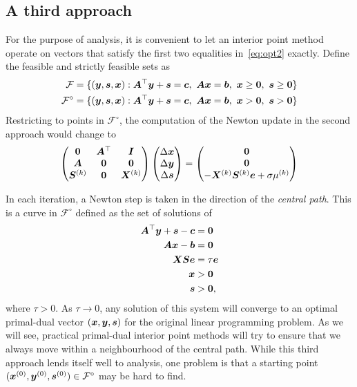 \subsection{A third approach}
For the purpose of analysis, it is convenient to let an interior point method operate on vectors that satisfy the first two equalities in~\eqref{eq:opt2} exactly. Define the feasible and strictly feasible sets as
\begin{align*}
 \mathcal{F} &= \{(\vct{y},\vct{s},\vct{x}) \mid \mtx{A}^{\trans}\vct{y}+\vct{s}=\vct{c}, \ \mtx{A}\vct{x}=\vct{b}, \ \vct{x}\geq \zerovct, \ \vct{s}\geq \zerovct\}\\
 \mathcal{F}^{\circ} &= \{(\vct{y},\vct{s},\vct{x}) \mid \mtx{A}^{\trans}\vct{y}+\vct{s}=\vct{c}, \ \mtx{A}\vct{x}=\vct{b}, \ \vct{x}> \zerovct, \ \vct{s}> \zerovct\}\\
\end{align*}
Restricting to points in $\mathcal{F}^{\circ}$, the computation of the Newton update in the second approach would change to
\begin{equation*}
 \begin{pmatrix}
  \bm{0} & \bm{A}^{\top} & \bm{I} \\
  \bm{A} & \bm{0} & \bm{0} \\
  \bm{S}^{(k)} & \bm{0} & \bm{X}^{(k)}
 \end{pmatrix}
\begin{pmatrix} \Delta\bm{x}\\ \Delta \bm{y}\\ \Delta\bm{s} \end{pmatrix} = \begin{pmatrix} \bm{0} \\ \bm{0} \\ -\bm{X}^{(k)}\bm{S}^{(k)}\bm{e}+\sigma \mu^{(k)}\end{pmatrix}
\end{equation*}

In each iteration, a Newton step is taken in the direction of the {\em central path}. This is a curve in $\mathcal{F}^{\circ}$ defined as the set of solutions of
\begin{align}\label{eq:cpopt}
 \begin{split}
  \bm{A}^{\top}\bm{y}+\bm{s}-\bm{c} &= \bm{0}\\
  \bm{A}\bm{x}-\bm{b} & = \bm{0}\\
  \bm{X}\bm{S}\bm{e} &= \tau \bm{e}\\
  \bm{x}&> \bm{0}\\
  \bm{s}&> \bm{0},
 \end{split}
\end{align}
where $\tau>0$. As $\tau\to 0$, any solution of this system will converge to an optimal primal-dual vector $(\bm{x},\bm{y},\bm{s})$ for the original linear programming problem. As we will see, practical primal-dual interior point methods will try to ensure that we always move within a neighbourhood of the central path. While this third approach lends itself well to analysis, one problem is that a starting point $(\bm{x}^{(0)},\bm{y}^{(0)},\bm{s}^{(0)})\in \mathcal{F}^{\circ}$ may be hard to find.



